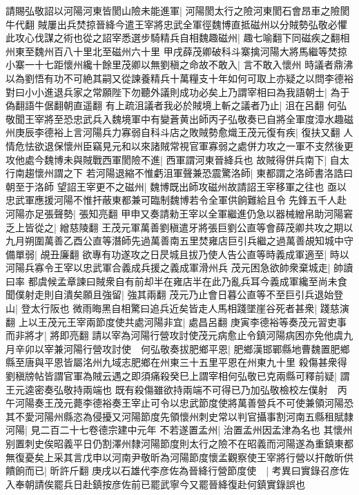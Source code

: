 請賜弘敬詔以河陽河東皆閡山險未能進軍|{
	河陽閡太行之險河東閡石會昂車之險閡牛代翻}
賊屢出兵焚掠晉絳今遣王宰將忠武全軍徑魏博直抵磁州以分賊勢弘敬必懼此攻心伐謀之術也從之詔宰悉選步騎精兵自相魏趣磁州|{
	趣七喻翻下同磁疾之翻相州東至魏州百八十里北至磁州六十里}
甲戌薛茂卿破科斗寨擒河陽大將馬繼等焚掠小寨一十七距懷州纔十餘里茂卿以無劉稹之命故不敢入|{
	言不敢入懷州}
時議者鼎沸以為劉悟有功不可絶其嗣又從諫養精兵十萬糧支十年如何可取上亦疑之以問李德裕對曰小小進退兵家之常願陛下勿聽外議則成功必矣上乃謂宰相曰為我語朝士|{
	為于偽翻語牛倨翻朝直遥翻}
有上疏沮議者我必於賊境上斬之議者乃止|{
	沮在呂翻}
何弘敬聞王宰將至恐忠武兵入魏境軍中有變蒼黄出師丙子弘敬奏已自將全軍度漳水趣磁州庚辰李德裕上言河陽兵力寡弱自科斗店之敗賊勢愈熾王茂元復有疾|{
	復扶又翻}
人情危怯欲退保懷州臣竊見元和以來諸賊常視官軍寡弱之處併力攻之一軍不支然後更攻他處今魏博未與賊戰西軍閡險不進|{
	西軍謂河東晉絳兵也}
故賊得併兵南下|{
	自太行南趨懷州謂之下}
若河陽退縮不惟虧沮軍聲兼恐震驚洛師|{
	東都謂之洛師書洛誥曰朝至于洛師}
望詔王宰更不之磁州|{
	魏博既出師攻磁州故請詔王宰移軍之往也}
亟以忠武軍應援河陽不惟扞蔽東都兼可臨制魏博若令全軍供餉難給且令先鋒五千人赴河陽亦足張聲勢|{
	張知亮翻}
甲申又奏請勑王宰以全軍繼進仍急以器械繒帛助河陽窘乏上皆從之|{
	繒慈陵翻}
王茂元軍萬善劉稹遣牙將張巨劉公直等會薛茂卿共攻之期以九月朔圍萬善乙酉公直等潛師先過萬善南五里焚雍店巨引兵繼之過萬善覘知城中守備單弱|{
	覘丑廉翻}
欲專有功遂攻之日昃城且拔乃使人告公直等時義成軍適至|{
	時以河陽兵寡令王宰以忠武軍合義成兵援之義成軍滑州兵}
茂元困急欲帥衆棄城走|{
	帥讀曰率}
都虞候孟章諫曰賊衆自有前却半在雍店半在此乃亂兵耳今義成軍纔至尚未食聞僕射走則自潰矣願且強留|{
	強其兩翻}
茂元乃止會日暮公直等不至巨引兵退始登山|{
	登太行阪也}
微雨晦黑自相驚曰追兵近矣皆走人馬相踐墜崖谷死者甚衆|{
	踐慈演翻}
上以王茂元王宰兩節度使共處河陽非宜|{
	處昌呂翻}
庚寅李德裕等奏茂元習吏事而非將才|{
	將即亮翻}
請以宰為河陽行營攻討使茂元病愈止令鎮河陽病困亦免他虞九月辛卯以宰兼河陽行營攻討使　何弘敬奏拔肥鄉平恩|{
	肥鄉漢邯鄲縣地曹魏置肥鄉縣至唐與平恩皆屬洺州九域志肥鄉在州東三十五里平恩在州東九十里}
殺傷甚衆得劉稹牓帖皆謂官軍為賊云遇之即須痛殺癸巳上謂宰相何弘敬已克兩縣可釋前疑|{
	謂王元逵密奏弘敬持兩端也}
既有殺傷雖欲持兩端不可得已乃加弘敬檢校左僕射　丙午河陽奏王茂元薨李德裕奏王宰止可令以忠武節度使將萬善營兵不可使兼領河陽恐其不愛河陽州縣恣為侵擾又河陽節度先領懷州刺史常以判官攝事割河南五縣租賦隸河陽|{
	見二百二十七卷德宗建中元年}
不若遂置孟州|{
	治置孟州因孟津為名也}
其懷州别置刺史俟昭義平日仍割澤州隸河陽節度則太行之險不在昭義而河陽遂為重鎮東都無復憂矣上采其言戊申以河南尹敬昕為河陽節度懷孟觀察使王宰將行營以扞敵昕供饋餉而已|{
	昕許斤翻}
庚戌以石雄代李彦佐為晉絳行營節度使　|{
	考異曰實錄召彦佐入奉朝請俟罷兵日赴鎮按彦佐前已罷武寧今又罷晉絳復赴何鎮實錄誤也}
